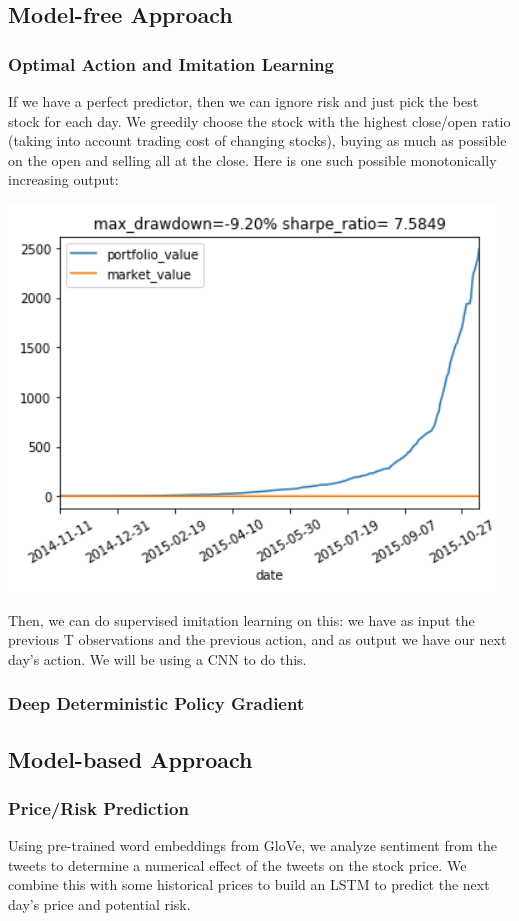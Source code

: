 \documentclass[a4paper, 10pt]{article}
\begin{document}
\begin{spacing}{1.2}
    \subsection{Model-free Approach}
    \subsubsection{Optimal Action and Imitation Learning}
    If we have a perfect predictor, then we can ignore risk and just pick the best stock for each day. We greedily choose the stock with the highest close/open ratio (taking into account trading cost of changing stocks), buying as much as possible on the open and selling all at the close. Here is one such possible monotonically increasing output: 
    
    \includegraphics[scale=0.5]{Optimal_with_trading_cost.png}
    
    Then, we can do supervised imitation learning on this: we have as input the previous T observations and the previous action, and as output we have our next day's action. We will be using a CNN to do this. 
    \subsubsection{Deep Deterministic Policy Gradient}
    
    
    \subsection{Model-based Approach}
    \subsubsection{Price/Risk Prediction}
    Using pre-trained word embeddings from GloVe, we analyze sentiment from the tweets to determine a numerical effect of the tweets on the stock price. We combine this with some historical prices to build an LSTM to predict the next day's price and potential risk. 

\end{spacing}
\end{document}
